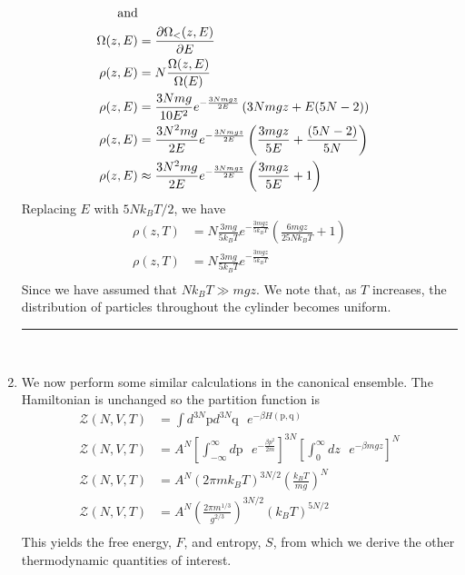\documentclass[]{book}
\begin{document}
\begin{enumerate}[1)]
\begin{equation}
\begin{split}
\text{and}\\
\Omega(z,E) & =  \pdv{\Omega_<(z, E)}{E} \\
\rho(z, E) & = N\frac{\Omega(z,E)}{\Omega(E)} \\
\rho(z, E) & =  \frac{3Nmg}{10E^2}e^{-\frac{3Nmgz}{2E}}\left( 3Nmgz  + E(5N-2) \right)\\
\rho(z, E) & =  \frac{3N^2mg}{2E}e^{-\frac{3Nmgz}{2E}} \left( \frac{3mgz}{5E}  + \frac{(5N-2)}{5N} \right)\\
\rho(z, E) & \approx  \frac{3N^2mg}{2E}e^{-\frac{3Nmgz}{2E}} \left( \frac{3mgz}{5E}  + 1 \right)\\
\end{split}
\end{equation}
Replacing $E$ with $5Nk_BT/2$, we have
\begin{equation}
\begin{split}
\rho(z, T) & =  N\frac{3 mg}{5k_BT}e^{-\frac{3mgz}{5k_BT}}\left( \frac{6mgz}{25Nk_BT}  +1 \right)\\
\rho(z, T) & =  N\frac{3 mg}{5k_BT}e^{-\frac{3mgz}{5k_BT}}\\
\end{split}
\end{equation}
Since we have assumed that $Nk_BT \gg mgz$. We note that, as $T$ increases, the distribution of particles throughout the cylinder becomes uniform. \\
\noindent\rule{15cm}{0.4pt} \\
\item
We now perform some similar calculations in the canonical ensemble. The Hamiltonian is unchanged so the partition function is
\begin{equation}
\begin{split}
\mathcal{Z}(N,V,T) & = \int d^{3N}\text{p} d^{3N} \text{q} \text{ } e^{-\beta H(\text{p},\text{q})} \\
\mathcal{Z}(N,V,T) & = A^N\left[ \int_{-\infty}^{\infty} d\text{p} \text{ } e^{-\frac{\beta p^2}{2m} } \right]^{3N}  \left[ \int_{0}^{\infty} dz \text{ }e^{-\beta mgz} \right]^{N} \\
\mathcal{Z}(N,V,T) & = A^N \left( 2\pi m k_B T \right)^{3N/2} \left( \frac{k_B T}{mg} \right)^{N} \\
\mathcal{Z}(N,V,T) & = A^N \left( \frac{2\pi m^{1/3} }{g^{2/3}} \right)^{3N/2}   (k_BT)^{5N/2} \\
\end{split}
\end{equation}
This yields the free energy, $F$, and entropy, $S$, from which we derive the other thermodynamic quantities of interest. 

\end{enumerate}
\end{document}
